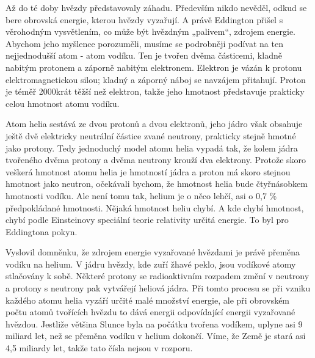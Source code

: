   Až do té doby hvězdy představovaly záhadu. Především nikdo nevěděl, odkud se bere obrovská
  energie, kterou hvězdy vyzařují. A právě Eddington přišel s věrohodným vysvětlením, co může být
  hvězdným „palivem“, zdrojem energie. Abychom jeho myšlence porozuměli, musíme se podrobněji
  podívat na ten nejjednodušší atom - atom vodíku. Ten je tvořen dvěma částicemi, kladně nabitým
  protonem a záporně nabitým elektronem. Elektron je vázán k protonu elektromagnetickou silou;
  kladný a záporný náboj se navzájem přitahují. Proton je téměř 2000krát těžší než elektron, takže
  jeho hmotnost představuje prakticky celou hmotnost atomu vodíku. 
  
  Atom helia sestává ze dvou protonů a dvou elektronů, jeho jádro však obsahuje ještě dvě elektricky
  neutrální částice zvané neutrony, prakticky stejně hmotné jako protony. Tedy jednoduchý model
  atomu helia vypadá tak, že kolem jádra tvořeného dvěma protony a dvěma neutrony krouží dva
  elektrony. Protože skoro veškerá hmotnost atomu helia je hmotností jádra a proton má skoro stejnou
  hmotnost jako neutron, očekávali bychom, že hmotnost helia bude čtyřnásobkem hmotnosti vodíku. Ale
  není tomu tak, helium je o něco lehčí, asi o 0,7 \% předpokládané hmotnosti. Nějaká hmotnost heliu
  chybí. A kde chybí hmotnost, chybí podle Einsteinovy speciální teorie relativity určitá energie.
  To byl pro Eddingtona pokyn. 
  
  Vyslovil domněnku, že zdrojem energie vyzařované hvězdami je právě přeměna vodíku na helium. V
  jádru hvězdy, kde zuří žhavé peklo, jsou vodíkové atomy stlačovány k sobě. Některé protony se
  radioaktivním rozpadem změní v neutrony a protony s neutrony pak vytvářejí heliová jádra. Při
  tomto procesu se při vzniku každého atomu helia vyzáří určité malé množství energie, ale při
  obrovském počtu atomů tvořících hvězdu to dává energii odpovídající energii vyzařované hvězdou.
  Jestliže většina Slunce byla na počátku tvořena vodíkem, uplyne asi 9 miliard let, než se přeměna
  vodíku v helium dokončí. Víme, že Země je stará asi 4,5 miliardy let, takže tato čísla nejsou v
  rozporu. 
  
